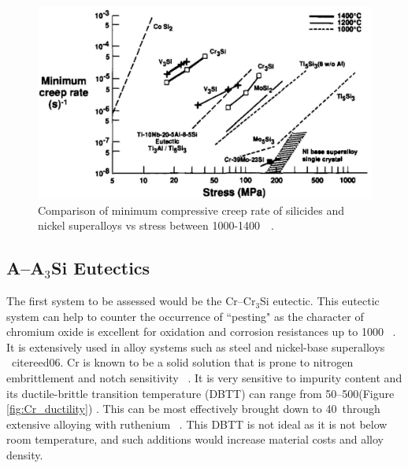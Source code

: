 \vspace{-.5cm}
%
\begin{figure}[H]
\begin{center}
\includegraphics[width=.9\textwidth]{creepshah92_2}
\caption{Comparison of minimum compressive creep rate of silicides and nickel superalloys vs stress between 1000-1400\celsius\ ~\cite{shah92}.}
\label{fig:creepshah92_2}
\end{center}
\end{figure}
%
\subsection{A--A$_3$Si Eutectics}

The first system to be assessed would be the Cr--Cr$_3$Si eutectic. This eutectic system can help to counter the occurrence of ``pesting" as the character of chromium oxide is excellent for oxidation and corrosion resistances up to 1000\celsius ~\cite{raj95a} . It is extensively used in alloy systems such as steel and nickel-base superalloys ~cite{reed06}. Cr is known to be a solid solution that is prone to nitrogen embrittlement and notch sensitivity ~\cite{abrahamson57}. It is very sensitive to impurity content and its ductile-brittle transition temperature (DBTT) can range from 50--500\celsius(Figure \ref{fig:Cr_ductility}) . This can be most effectively brought down to 40\celsius\ through extensive alloying with ruthenium ~\cite{abrahamson57}. This DBTT is not ideal as it is not below room temperature, and such additions would increase material costs and alloy density.

